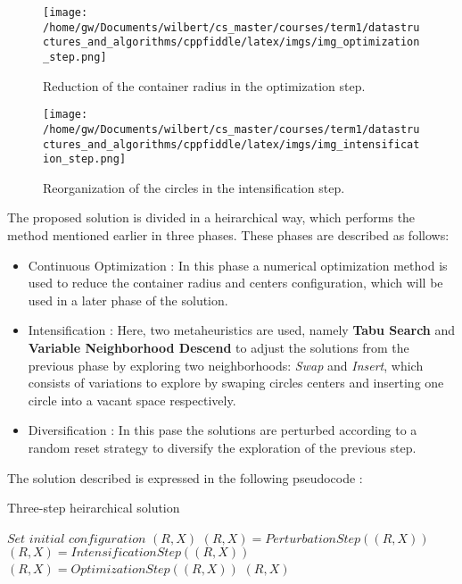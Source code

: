 \documentclass{article}
\begin{document}
\begin{figure}[H]
	\centering
	\texttt{[image: /home/gw/Documents/wilbert/cs\_master/courses/term1/datastructures\_and\_algorithms/cppfiddle/latex/imgs/img\_optimization\_step.png]}
	\caption{Reduction of the container radius in the optimization step.}
	\label{fig:img_pecc}
\end{figure}

\begin{figure}[H]
	\centering
	\texttt{[image: /home/gw/Documents/wilbert/cs\_master/courses/term1/datastructures\_and\_algorithms/cppfiddle/latex/imgs/img\_intensification\_step.png]}
	\caption{Reorganization of the circles in the intensification step.}
	\label{fig:img_pecc}
\end{figure}

The proposed solution is divided in a heirarchical way, which performs the method mentioned earlier in three phases. These phases are described as follows:

\begin{itemize}
\item Continuous Optimization : In this phase a numerical optimization method is used to reduce the container radius and centers configuration, which will be used in a later phase of the solution.
\item Intensification : Here, two metaheuristics are used, namely \textbf{Tabu Search} and \textbf{Variable Neighborhood Descend} to adjust the solutions from the previous phase by exploring two neighborhoods: \textit{Swap} and \textit{Insert}, which consists of variations to explore by swaping circles centers and inserting one circle into a vacant space respectively.
\item Diversification : In this pase the solutions are perturbed according to a random reset strategy to diversify the exploration of the previous step.
\end{itemize}


The solution described is expressed in the following pseudocode :\\

\begin{algorithm}
\caption{Three-step heirarchical solution}\label{solution_pseudocode}
\begin{algorithmic}[1]
\State $\textit{Set initial configuration }(R,X)$
	\State $(R,X)=\textit{PerturbationStep}((R,X))$
	\State $(R,X)=\textit{IntensificationStep}((R,X))$
	\State $(R,X)=\textit{OptimizationStep}((R,X))$
\EndWhile
\Return $(R,X)$
\end{algorithmic}
\end{algorithm}
\end{document}
